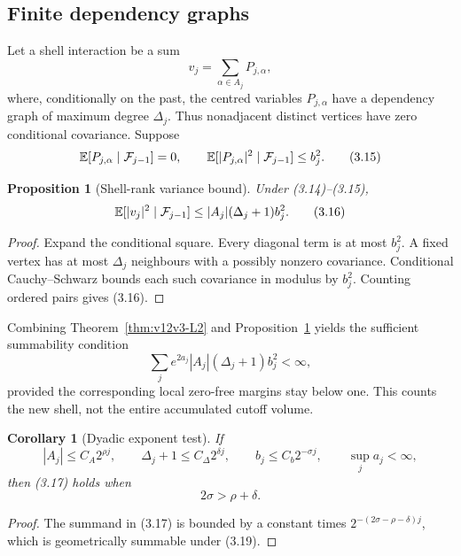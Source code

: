 \documentclass[11pt]{article}
\newtheorem{proposition}[theorem]{Proposition}
\newtheorem{corollary}[theorem]{Corollary}
\theoremstyle{remark}
\begin{document}
\subsection{Finite dependency graphs}

Let a shell interaction be a sum
\[
                              v_j=\sum_{\alpha\in A_j}P_{j,\alpha},
                                                                    \tag{3.14}
\]
where, conditionally on the past, the centred variables
\(P_{j,\alpha}\) have a dependency graph of maximum degree
\(\Delta_j\).  Thus nonadjacent distinct vertices have zero conditional
covariance.  Suppose
\[
 \mathbb E[P_{j,\alpha}\mid{\cal F}_{j-1}]=0,\qquad
 \mathbb E[|P_{j,\alpha}|^2\mid{\cal F}_{j-1}]
                              \le b_j^2.                     \tag{3.15}
\]

\begin{proposition}[Shell-rank variance bound]
\label{prop:v12v3-dependency}
Under (3.14)--(3.15),
\[
 \mathbb E[|v_j|^2\mid{\cal F}_{j-1}]
 \le |A_j|(\Delta_j+1)b_j^2.                                \tag{3.16}
\]
\end{proposition}

\begin{proof}
Expand the conditional square.  Every diagonal term is at most
\(b_j^2\).  A fixed vertex has at most \(\Delta_j\) neighbours with a
possibly nonzero covariance.  Conditional Cauchy--Schwarz bounds each
such covariance in modulus by \(b_j^2\).  Counting ordered pairs gives
(3.16).
\end{proof}

Combining Theorem~\ref{thm:v12v3-L2} and
Proposition~\ref{prop:v12v3-dependency} yields the sufficient
summability condition
\[
 \sum_j e^{2a_j}|A_j|(\Delta_j+1)b_j^2<\infty,               \tag{3.17}
\]
provided the corresponding local zero-free margins stay below one.
This counts the new shell, not the entire accumulated cutoff volume.

\begin{corollary}[Dyadic exponent test]
\label{cor:v12v3-dyadic}
If
\[
 |A_j|\le C_A2^{\rho j},\qquad
 \Delta_j+1\le C_\Delta2^{\delta j},\qquad
 b_j\le C_b2^{-\sigma j},\qquad
 \sup_ja_j<\infty,                                          \tag{3.18}
\]
then (3.17) holds when
\[
                              2\sigma>\rho+\delta.           \tag{3.19}
\]
\end{corollary}

\begin{proof}
The summand in (3.17) is bounded by a constant times
\(2^{-(2\sigma-\rho-\delta)j}\), which is geometrically summable under
(3.19).
\end{proof}
\end{document}
